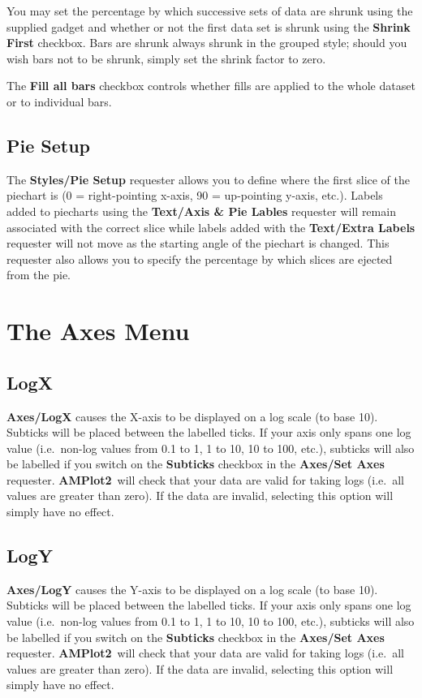 \documentclass{report}
\newcommand{\amplot}{{\bf AMPlot2}}
\begin{document}
You may set the percentage by which successive sets of data are shrunk
 using the supplied gadget
and whether or not the first data set is shrunk using the {\bf Shrink First} 
checkbox. Bars are shrunk always shrunk in the grouped style; should you wish bars 
not to be shrunk, simply set the shrink factor to zero. 

The {\bf Fill all bars} checkbox controls whether fills are applied to the whole 
dataset or to individual bars.


\subsection{Pie Setup}
The {\bf Styles/Pie Setup} requester allows you to define where 
the first slice 
of the piechart is (0 = right-pointing x-axis, 90 = up-pointing y-axis, etc.).
Labels added to piecharts using the {\bf Text/Axis \& Pie Lables} requester will 
remain associated with the correct slice while labels added with the {\bf Text/Extra 
Labels} requester will not move as the starting angle of the piechart is changed.
This requester also allows you to specify the percentage by which slices are 
ejected from the pie.



\section{The Axes Menu}

\subsection{LogX}
{\bf Axes/LogX} causes  the X-axis to be displayed on 
a log scale (to base 10). Subticks will be 
placed between the labelled ticks. If your axis only
spans one log value (i.e.\ non-log values from 0.1 to 1, 1 to 10, 10 to 100, 
etc.), subticks will also be labelled if you switch on the {\bf Subticks} checkbox 
in the {\bf Axes/Set Axes} requester. \amplot\ will check that your data are valid 
for taking logs (i.e.\ all values are greater than zero). If the data are invalid, 
selecting this option will simply have no effect.


\subsection{LogY}
{\bf Axes/LogY} causes  the Y-axis to be displayed on 
a log scale (to base 10). Subticks will be 
placed between the labelled ticks. If your axis only
spans one log value (i.e.\ non-log values from 0.1 to 1, 1 to 10, 10 to 100, 
etc.), subticks will also be labelled if you switch on the {\bf Subticks} checkbox 
in the {\bf Axes/Set Axes} requester. \amplot\ will check that your data are valid 
for taking logs (i.e.\ all values are greater than zero). If the data are invalid, 
selecting this option will simply have no effect.
\end{document}
